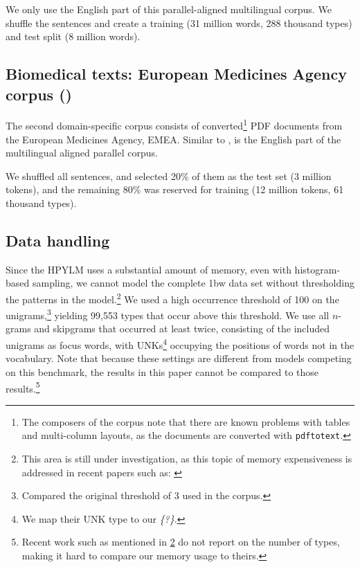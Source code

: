   We only use the English part of this parallel-aligned multilingual corpus. We shuffle the sentences and create a training (31 million words, 288 thousand types) and test split (8 million words).
    
   
  \subsection{Biomedical texts: European Medicines Agency corpus (\emea)}
  The second domain-specific corpus consists of converted\footnote{The composers of the corpus note that there are known problems with tables and multi-column layouts, as the documents are converted with \texttt{pdftotext}.} PDF documents from the European Medicines Agency, EMEA\autocite{tiedemann2009news}. Similar to \jrc, \emea is the English part of the multilingual aligned parallel corpus.
  
  We shuffled all sentences, and selected 20\% of them as the test set (3 million tokens), and the remaining 80\% was reserved for training (12 million tokens, 61 thousand types).
  
  
  \subsection{Data handling}
	Since the HPYLM uses a substantial amount of memory, even with histogram-based sampling, we cannot model the complete 1bw data set without thresholding the patterns in the model.\footnote[][-3em]{\label{fn:shareghi}This area is still under investigation, as this topic of memory expensiveness is addressed in recent papers such as: \autocite{shareghi2017compressed}} We used a high occurrence threshold of 100 on the unigrams,\footnote{Compared the original threshold of 3 used in the corpus.} yielding 99,553 types that occur above this threshold. We use all $n$-grams and skipgrams that occurred at least twice, consisting of the included unigrams as focus words, with UNKs\footnote{We map their UNK type to our \emph{\{?\}}.} occupying the positions of words not in the vocabulary. Note that because these settings are different from models competing on this benchmark, the results in this paper cannot be compared to those results.\footnote{Recent work such as mentioned in \cref{fn:shareghi} do not report on the number of types, making it hard to compare our memory usage to theirs.}
    

